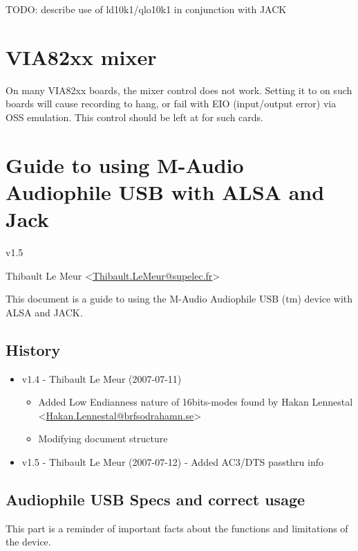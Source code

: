 \documentclass[a4paper,8pt,english]{sphinxmanual}
\begin{document}
TODO: describe use of ld10k1/qlo10k1 in conjunction with JACK


\section{VIA82xx mixer}
\label{sound/cards/via82xx-mixer::doc}\label{sound/cards/via82xx-mixer:via82xx-mixer}
On many VIA82xx boards, the  mixer control does not work.
Setting it to  on such boards will cause recording to hang, or fail
with EIO (input/output error) via OSS emulation.  This control should be left
at  for such cards.


\section{Guide to using M-Audio Audiophile USB with ALSA and Jack}
\label{sound/cards/audiophile-usb::doc}\label{sound/cards/audiophile-usb:guide-to-using-m-audio-audiophile-usb-with-alsa-and-jack}
v1.5

Thibault Le Meur \textless{}\href{mailto:Thibault.LeMeur@supelec.fr}{Thibault.LeMeur@supelec.fr}\textgreater{}

This document is a guide to using the M-Audio Audiophile USB (tm) device with
ALSA and JACK.


\subsection{History}
\label{sound/cards/audiophile-usb:history}\begin{itemize}
\item {} 
v1.4 - Thibault Le Meur (2007-07-11)
\begin{itemize}
\item {} 
Added Low Endianness nature of 16bits-modes
found by Hakan Lennestal \textless{}\href{mailto:Hakan.Lennestal@brfsodrahamn.se}{Hakan.Lennestal@brfsodrahamn.se}\textgreater{}

\item {} 
Modifying document structure

\end{itemize}

\item {} 
v1.5 - Thibault Le Meur (2007-07-12)
- Added AC3/DTS passthru info

\end{itemize}


\subsection{Audiophile USB Specs and correct usage}
\label{sound/cards/audiophile-usb:audiophile-usb-specs-and-correct-usage}
This part is a reminder of important facts about the functions and limitations
of the device.
\end{document}

